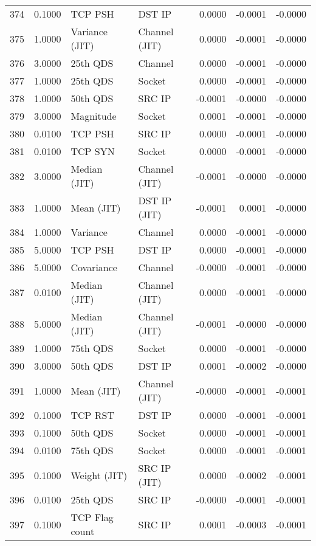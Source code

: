 \begin{longtable}{lrllrrr}
374 & 0.1000 & TCP PSH & DST IP & 0.0000 & -0.0001 & -0.0000 \\
375 & 1.0000 & Variance (JIT) & Channel (JIT) & 0.0000 & -0.0001 & -0.0000 \\
376 & 3.0000 & 25th QDS & Channel & 0.0000 & -0.0001 & -0.0000 \\
377 & 1.0000 & 25th QDS & Socket & 0.0000 & -0.0001 & -0.0000 \\
378 & 1.0000 & 50th QDS & SRC IP & -0.0001 & -0.0000 & -0.0000 \\
379 & 3.0000 & Magnitude & Socket & 0.0001 & -0.0001 & -0.0000 \\
380 & 0.0100 & TCP PSH & SRC IP & 0.0000 & -0.0001 & -0.0000 \\
381 & 0.0100 & TCP SYN & Socket & 0.0000 & -0.0001 & -0.0000 \\
382 & 3.0000 & Median (JIT) & Channel (JIT) & -0.0001 & -0.0000 & -0.0000 \\
383 & 1.0000 & Mean (JIT) & DST IP (JIT) & -0.0001 & 0.0001 & -0.0000 \\
384 & 1.0000 & Variance & Channel & 0.0000 & -0.0001 & -0.0000 \\
385 & 5.0000 & TCP PSH & DST IP & 0.0000 & -0.0001 & -0.0000 \\
386 & 5.0000 & Covariance & Channel & -0.0000 & -0.0001 & -0.0000 \\
387 & 0.0100 & Median (JIT) & Channel (JIT) & 0.0000 & -0.0001 & -0.0000 \\
388 & 5.0000 & Median (JIT) & Channel (JIT) & -0.0001 & -0.0000 & -0.0000 \\
389 & 1.0000 & 75th QDS & Socket & 0.0000 & -0.0001 & -0.0000 \\
390 & 3.0000 & 50th QDS & DST IP & 0.0001 & -0.0002 & -0.0000 \\
391 & 1.0000 & Mean (JIT) & Channel (JIT) & -0.0000 & -0.0001 & -0.0001 \\
392 & 0.1000 & TCP RST & DST IP & 0.0000 & -0.0001 & -0.0001 \\
393 & 0.1000 & 50th QDS & Socket & 0.0000 & -0.0001 & -0.0001 \\
394 & 0.0100 & 75th QDS & Socket & 0.0000 & -0.0001 & -0.0001 \\
395 & 0.1000 & Weight (JIT) & SRC IP (JIT) & 0.0000 & -0.0002 & -0.0001 \\
396 & 0.0100 & 25th QDS & SRC IP & -0.0000 & -0.0001 & -0.0001 \\
397 & 0.1000 & TCP Flag count & SRC IP & 0.0001 & -0.0003 & -0.0001 \\

\end{longtable}
